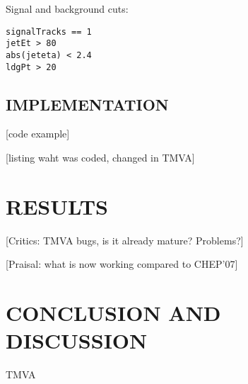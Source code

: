 \documentclass[twoside,floatfix,a4wide]{revtex4}
\begin{document}
Signal and background cuts:
\begin{verbatim}
signalTracks == 1
jetEt > 80
abs(jeteta) < 2.4
ldgPt > 20
\end{verbatim}


\subsection{IMPLEMENTATION \label{section:implementation}}
[code example]

[listing waht was coded, changed in TMVA]

\section{RESULTS} \label{sec:example}









[Critics: TMVA bugs, is it already mature? Problems?]

[Praisal: what is now working compared to CHEP'07]

\section{CONCLUSION AND DISCUSSION} \label{sec:conclusion}
TMVA



\end{document}
